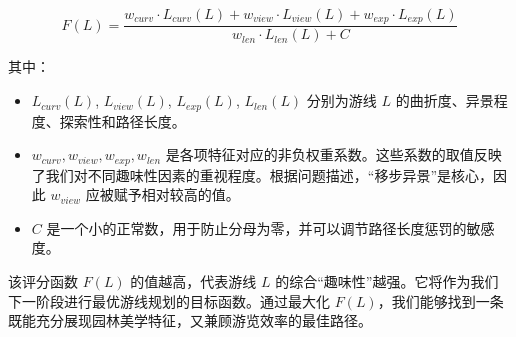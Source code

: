 \documentclass[11pt]{article}
\theoremstyle{definition}
\begin{document}
$$ F(L) = \frac{w_{curv} \cdot L_{curv}(L) + w_{view} \cdot L_{view}(L) + w_{exp} \cdot L_{exp}(L)}{w_{len} \cdot L_{len}(L) + C} $$

其中：
\begin{itemize}
	\item $L_{curv}(L)$, $L_{view}(L)$, $L_{exp}(L)$, $L_{len}(L)$ 分别为游线 $L$ 的曲折度、异景程度、探索性和路径长度。
	\item $w_{curv}, w_{view}, w_{exp}, w_{len}$ 是各项特征对应的非负权重系数。这些系数的取值反映了我们对不同趣味性因素的重视程度。根据问题描述，“移步异景”是核心，因此 $w_{view}$ 应被赋予相对较高的值。
	\item $C$ 是一个小的正常数，用于防止分母为零，并可以调节路径长度惩罚的敏感度。
\end{itemize}

该评分函数 $F(L)$ 的值越高，代表游线 $L$ 的综合“趣味性”越强。它将作为我们下一阶段进行最优游线规划的目标函数。通过最大化 $F(L)$，我们能够找到一条既能充分展现园林美学特征，又兼顾游览效率的最佳路径。
\end{document}
